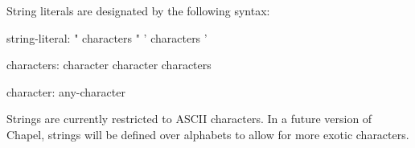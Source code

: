 String literals are designated by the following syntax:
\begin{syntax}
string-literal:
  " characters "
  ' characters '

characters:
  character
  character characters

character:
  any-character
\end{syntax}

\begin{implementation}
Strings are currently restricted to ASCII characters.  In a future
version of Chapel, strings will be defined over alphabets to allow for
more exotic characters.
\end{implementation}
